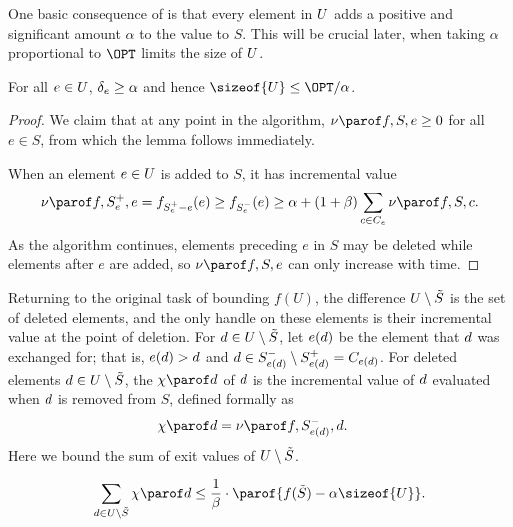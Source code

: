 \documentclass[oneside,letterpaper]{scrartcl} \usepackage{macros}
\begin{document}
One basic consequence of 
is that every element in $U$ adds a positive and significant
amount $\alpha$ to the value to $S$. This will be crucial later, when
taking $\alpha$ proportional to $\OPT$ limits the size of $U$.
\begin{lemma} For all $e \in U$, $\delta_{e} \geq \alpha$ and hence
  $\sizeof{\takens} \leq \OPT / \alpha$.
\end{lemma}
\begin{proof}
  We claim that at any point in the algorithm, $\incvalueof{f}{S}{e}
  \geq 0$ for all $e \in S$, from which the lemma follows
   immediately.

  When an element $e \in U$ is added to $S$, it has incremental
  value
  \begin{align*}
    \incvalueof{f}{\setafter{e}}{e} = f_{\setafter{e} - e}(e) \geq f_{\setbefore{e}}(e) \geq \alpha + (1 + \beta) \sum_{c \in \candidatesfor{e}}
    \incvalueof{f}{S}{c}.
  \end{align*}
  As the algorithm continues, elements preceding $e$ in $S$ may be
  deleted while elements after $e$ are added, so
  $\incvalueof{f}{S}{e}$ can only increase with time.
\end{proof}
Returning to the original task of bounding $f(U)$, the difference
$U \setminus \tilde{S}$ is the set of deleted elements, and the
only handle on these elements is their incremental value at the point
of deletion. For $d \in U \setminus \tilde{S}$, let $e(d)$ be the
element that $d$ was exchanged for; that is, $e(d) > d$
and $d \in S_{e(d)}^- \setminus S_{e(d)}^+
= C_{e(d)}$. For deleted elements $d \in
U \setminus \tilde{S}$, the  $\exitvalueof{\deleted}$ of
$d$ is the incremental value of $d$ evaluated when
$d$ is removed from $S$, defined formally as
\begin{align*}
  \exitvalueof{\deleted} &= \incvalueof{f}{\setbefore{\replacement}}{\deleted}.
\end{align*}
Here we bound the sum of exit values of $U \setminus \tilde{S}$.
\begin{lemma}
  \begin{align*}
    \sum_{\deleted \in \deleteds} \exitvalueof{\deleted} \leq \frac{1}{\beta} \cdot \parof{f(\finalset) - \alpha \sizeof{U}}.
  \end{align*}
\end{lemma}
\end{document}
